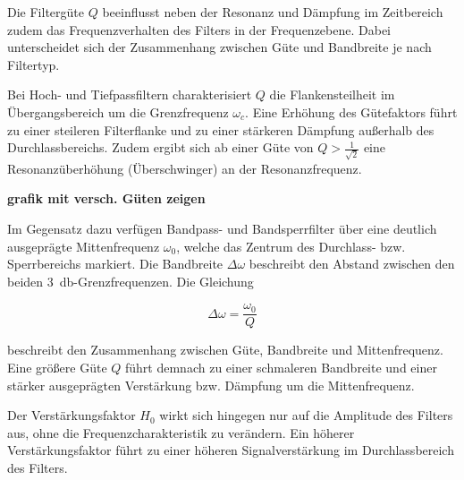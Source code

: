\documentclass[../main_config.tex]{subfiles}
\begin{document}



Die Filtergüte $Q$ beeinflusst neben der Resonanz und Dämpfung im Zeitbereich zudem das Frequenzverhalten des Filters in der Frequenzebene. Dabei unterscheidet sich der Zusammenhang zwischen Güte und Bandbreite je nach Filtertyp.\par
\medskip
Bei Hoch- und Tiefpassfiltern charakterisiert $Q$ die Flankensteilheit im Übergangsbereich um die Grenzfrequenz $\omega_c$. Eine Erhöhung des Gütefaktors führt zu einer steileren Filterflanke und zu einer stärkeren Dämpfung außerhalb des Durchlassbereichs. Zudem ergibt sich ab einer Güte von $Q > \frac{1}{\sqrt{2}}$ eine Resonanzüberhöhung (Überschwinger) an der Resonanzfrequenz.\par
\medskip

\textbf{grafik mit versch. Güten zeigen}

Im Gegensatz dazu verfügen Bandpass- und Bandsperrfilter über eine deutlich ausgeprägte Mittenfrequenz $\omega_0$, welche das Zentrum des Durchlass- bzw. Sperrbereichs markiert. Die Bandbreite $\Delta\omega$ beschreibt den Abstand zwischen den beiden \SI{3}{\decibel}-Grenzfrequenzen. Die Gleichung  

\begin{equation}
\Delta\omega = \frac{\omega_0}{Q}
\label{VerkleinerungBandbreite}
\end{equation}

beschreibt den Zusammenhang zwischen Güte, Bandbreite und Mittenfrequenz. Eine größere Güte $Q$ führt demnach zu einer schmaleren Bandbreite und einer stärker ausgeprägten Verstärkung bzw. Dämpfung um die Mittenfrequenz. \cite{schaumanndesign}\par
\medskip

Der Verstärkungsfaktor $H_0$ wirkt sich hingegen nur auf die Amplitude des Filters aus, ohne die Frequenzcharakteristik zu verändern. Ein höherer Verstärkungsfaktor führt zu einer höheren Signalverstärkung im Durchlassbereich des Filters. \par
\medskip
\end{document}
